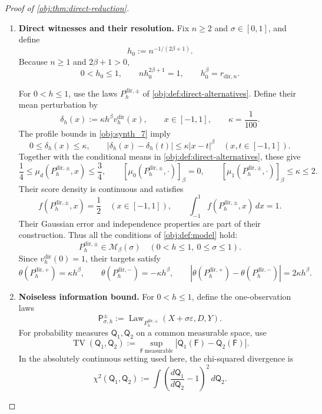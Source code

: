 \begin{proof}[Proof of \cref{obj:thm:direct-reduction}]
\begin{enumerate}
\item \textbf{Direct witnesses and their resolution.}
Fix \(n\ge2\) and \(\sigma\in[0,1]\), and define
\[
h_0:=n^{-1/(2\beta+1)}.
\]
Because \(n\ge1\) and \(2\beta+1>0\),
\[
0<h_0\le1,
\qquad
nh_0^{2\beta+1}=1,
\qquad
h_0^\beta=r_{\mathrm{dir},n}.
\]

For \(0<h\le1\), use the laws \(P_h^{\mathrm{dir},\pm}\) of \cref{obj:def:direct-alternatives}. Define their mean perturbation by
\[
\delta_h(x):=\kappa h^\beta v_h^{\mathrm{dir}}(x),
\qquad x\in[-1,1],
\qquad
\kappa=\frac1{100}.
\]
The profile bounds in \cref{obj:synth_7} imply
\[
0\le\delta_h(x)\le\kappa,
\qquad
|\delta_h(x)-\delta_h(t)|
\le\kappa|x-t|^\beta
\quad(x,t\in[-1,1]).
\]
Together with the conditional means in \cref{obj:def:direct-alternatives}, these give
\[
\frac14
\le\mu_d(P_h^{\mathrm{dir},\pm},x)
\le\frac34,
\qquad
[\mu_0(P_h^{\mathrm{dir},\pm},\cdot)]_\beta=0,
\qquad
[\mu_1(P_h^{\mathrm{dir},\pm},\cdot)]_\beta\le\kappa\le2.
\]
Their score density is continuous and satisfies
\[
f(P_h^{\mathrm{dir},\pm},x)=\frac12
\quad(x\in[-1,1]),
\qquad
\int_{-1}^1f(P_h^{\mathrm{dir},\pm},x)\,dx=1.
\]
Their Gaussian error and independence properties are part of their construction. Thus all the conditions of \cref{obj:def:model} hold:
\[
P_h^{\mathrm{dir},\pm}\in\mathcal M_\beta(\sigma)
\quad(0<h\le1,\ 0\le\sigma\le1).
\]
Since \(v_h^{\mathrm{dir}}(0)=1\), their targets satisfy
\[
\theta(P_h^{\mathrm{dir},+})=\kappa h^\beta,
\qquad
\theta(P_h^{\mathrm{dir},-})=-\kappa h^\beta,
\qquad
\left|\theta(P_h^{\mathrm{dir},+})
-\theta(P_h^{\mathrm{dir},-})\right|
=2\kappa h^\beta.
\]

\item \textbf{Noiseless information bound.}
For \(0<h\le1\), define the one-observation laws
\[
\mathsf P_{\sigma,h}^{\pm}
:=\operatorname{Law}_{P_h^{\mathrm{dir},\pm}}
(X+\sigma\varepsilon,D,Y).
\]
For probability measures \(\mathsf Q_1,\mathsf Q_2\) on a common measurable space, use
\[
\operatorname{TV}(\mathsf Q_1,\mathsf Q_2)
:=\sup_{\mathsf F\ \mathrm{measurable}}
|\mathsf Q_1(\mathsf F)-\mathsf Q_2(\mathsf F)|.
\]
In the absolutely continuous setting used here, the chi-squared divergence is
\[
\chi^2(\mathsf Q_1,\mathsf Q_2)
:=\int
\left(\frac{d\mathsf Q_1}{d\mathsf Q_2}-1\right)^2
\,d\mathsf Q_2.
\]


\end{enumerate}
\end{proof}
